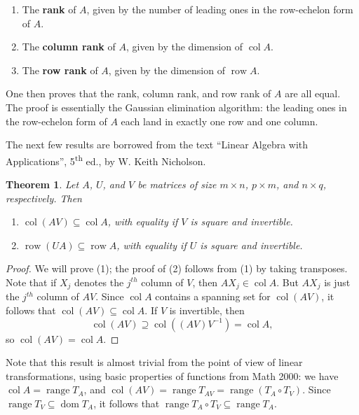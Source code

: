 \documentclass[letterpaper,12pt]{article}
\newtheorem{theorem}{Theorem}
\DeclareMathOperator{\range}{range}
\DeclareMathOperator{\col}{col}
\DeclareMathOperator{\row}{row}
\DeclareMathOperator{\dom}{dom}
\begin{document}
\begin{enumerate}
 \item The {\bf rank} of $A$, given by the number of leading ones in the row-echelon form of $A$.
 \item The {\bf column rank} of $A$, given by the dimension of $\col A$.
 \item The {\bf row rank} of $A$, given by the dimension of $\row A$.
\end{enumerate}
One then proves that the rank, column rank, and row rank of $A$ are all equal. The proof is essentially the Gaussian elimination algorithm: the leading ones in the row-echelon form of $A$ each land in exactly one row and one column.

The next few results are borrowed from the text ``Linear Algebra with Applications'', 5\textsuperscript{th} ed., by W. Keith Nicholson.
\begin{theorem}\label{1}
 Let $A$, $U$, and $V$ be matrices of size $m\times n$, $p\times m$, and $n\times q$, respectively. Then
\begin{enumerate}
 \item $\col(AV)\subseteq \col A$, with equality if $V$ is square and invertible.
 \item $\row(UA)\subseteq \row A$, with equality if $U$ is square and invertible.
\end{enumerate}
\end{theorem}
\begin{proof}
 We will prove (1); the proof of (2) follows from (1) by taking transposes. Note that if $X_j$ denotes the $j^{th}$ column of $V$, then $AX_j\in \col A$. But $AX_j$ is just the $j^{th}$ column of $AV$. Since $\col A$ contains a spanning set for $\col (AV)$, it follows that $\col(AV)\subseteq \col A$. If $V$ is invertible, then 
\[
 \col(AV)\supseteq \col((AV)V^{-1}) = \col A,
\]
so $\col (AV) = \col A$.
\end{proof}
Note that this result is almost trivial from the point of view of linear transformations, using basic properties of functions from Math 2000: we have $\col A = \range T_A$, and $\col (AV) = \range T_{AV} = \range (T_A\circ T_V)$. Since $\range T_V\subseteq \dom T_A$, it follows that $\range T_A\circ T_V \subseteq \range T_A$. 
\end{document}
